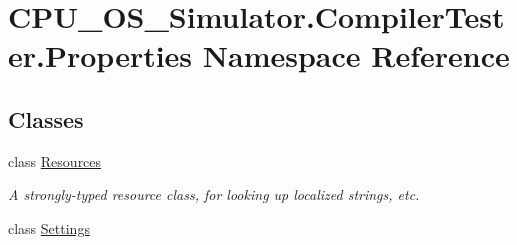 \hypertarget{namespace_c_p_u___o_s___simulator_1_1_compiler_tester_1_1_properties}{}\section{C\+P\+U\+\_\+\+O\+S\+\_\+\+Simulator.\+Compiler\+Tester.\+Properties Namespace Reference}
\label{namespace_c_p_u___o_s___simulator_1_1_compiler_tester_1_1_properties}
\subsection*{Classes}
\begin{DoxyCompactItemize}
\item 
class \hyperlink{class_c_p_u___o_s___simulator_1_1_compiler_tester_1_1_properties_1_1_resources}{Resources}
\begin{DoxyCompactList}\small\item\em A strongly-\/typed resource class, for looking up localized strings, etc. \end{DoxyCompactList}\item 
class \hyperlink{class_c_p_u___o_s___simulator_1_1_compiler_tester_1_1_properties_1_1_settings}{Settings}
\end{DoxyCompactItemize}
